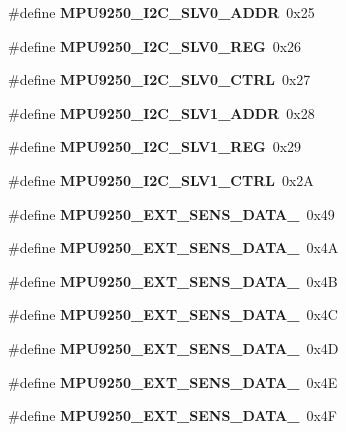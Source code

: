 \begin{DoxyCompactItemize}
\#define {\bfseries M\+P\+U9250\+\_\+\+I2\+C\+\_\+\+S\+L\+V0\+\_\+\+A\+D\+DR}~0x25
\item 
\mbox{\label{_i_m_u__functions_8h_ad5819386ba91b6b113ff8cf8335e0679}} 
\#define {\bfseries M\+P\+U9250\+\_\+\+I2\+C\+\_\+\+S\+L\+V0\+\_\+\+R\+EG}~0x26
\item 
\mbox{\label{_i_m_u__functions_8h_a1513e5f1f2c5ca628f67d212ab4f5f12}} 
\#define {\bfseries M\+P\+U9250\+\_\+\+I2\+C\+\_\+\+S\+L\+V0\+\_\+\+C\+T\+RL}~0x27
\item 
\mbox{\label{_i_m_u__functions_8h_a4c75a33c83923d516cb845ca8ca0d3dc}} 
\#define {\bfseries M\+P\+U9250\+\_\+\+I2\+C\+\_\+\+S\+L\+V1\+\_\+\+A\+D\+DR}~0x28
\item 
\mbox{\label{_i_m_u__functions_8h_ade10530b44c603a3a1c133cbb407c3c0}} 
\#define {\bfseries M\+P\+U9250\+\_\+\+I2\+C\+\_\+\+S\+L\+V1\+\_\+\+R\+EG}~0x29
\item 
\mbox{\label{_i_m_u__functions_8h_aae60d3360aeba41250cfe5db3aa19ea1}} 
\#define {\bfseries M\+P\+U9250\+\_\+\+I2\+C\+\_\+\+S\+L\+V1\+\_\+\+C\+T\+RL}~0x2A
\item 
\mbox{\label{_i_m_u__functions_8h_a89ebc64bc3c3659eb1a8faeb53f2f1ef}} 
\#define {\bfseries M\+P\+U9250\+\_\+\+E\+X\+T\+\_\+\+S\+E\+N\+S\+\_\+\+D\+A\+T\+A\+\_}~0x49
\item 
\mbox{\label{_i_m_u__functions_8h_a5f7838ce33b1da366466972b3230e39c}} 
\#define {\bfseries M\+P\+U9250\+\_\+\+E\+X\+T\+\_\+\+S\+E\+N\+S\+\_\+\+D\+A\+T\+A\+\_}~0x4A
\item 
\mbox{\label{_i_m_u__functions_8h_aebddf028777b182e7281a6257058d242}} 
\#define {\bfseries M\+P\+U9250\+\_\+\+E\+X\+T\+\_\+\+S\+E\+N\+S\+\_\+\+D\+A\+T\+A\+\_}~0x4B
\item 
\mbox{\label{_i_m_u__functions_8h_a5d3058dc98d943b9ac16259e6f5f5c56}} 
\#define {\bfseries M\+P\+U9250\+\_\+\+E\+X\+T\+\_\+\+S\+E\+N\+S\+\_\+\+D\+A\+T\+A\+\_}~0x4C
\item 
\mbox{\label{_i_m_u__functions_8h_a6456046467c05d4148dc4129d7d98ab2}} 
\#define {\bfseries M\+P\+U9250\+\_\+\+E\+X\+T\+\_\+\+S\+E\+N\+S\+\_\+\+D\+A\+T\+A\+\_}~0x4D
\item 
\mbox{\label{_i_m_u__functions_8h_a4bfcbc345ce09aaa3a8ba17423ae35c6}} 
\#define {\bfseries M\+P\+U9250\+\_\+\+E\+X\+T\+\_\+\+S\+E\+N\+S\+\_\+\+D\+A\+T\+A\+\_}~0x4E
\item 
\mbox{\label{_i_m_u__functions_8h_ae45a312a0d42f4c1192e1eb999aa6421}} 
\#define {\bfseries M\+P\+U9250\+\_\+\+E\+X\+T\+\_\+\+S\+E\+N\+S\+\_\+\+D\+A\+T\+A\+\_}~0x4F
\item 

\end{DoxyCompactItemize}

